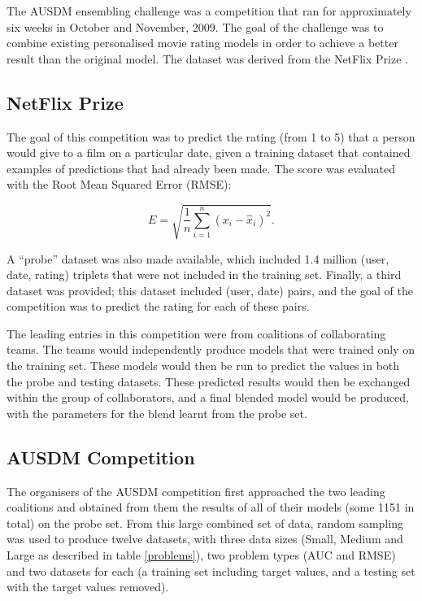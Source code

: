 \documentclass{article}
\begin{document}
The AUSDM ensembling challenge was a competition that ran for approximately six weeks in October and November, 2009.  The goal of the challenge was to combine existing personalised movie rating models in order to achieve a better result than the original model.  The dataset was derived from the NetFlix Prize \cite{NetFlixPrize}.

\subsection{NetFlix Prize}

The goal of this competition was to predict the rating (from 1 to 5) that a person would give to a film on a particular date, given a training dataset that contained examples of predictions that had already been made.  The score was evaluated with the Root Mean Squared Error (RMSE):

\begin{equation}
E = \sqrt{\frac{1}{n} \sum_{i=1}^{n} (x_i - \hat{x}_i)^2} \label{RMSE}.
\end{equation}

A ``probe'' dataset was also made available, which included 1.4 million (user, date, rating) triplets that were not included in the training set.  Finally, a third dataset was provided; this dataset included (user, date) pairs, and the goal of the competition was to predict the rating for each of these pairs.

The leading entries in this competition were from coalitions of collaborating teams.  The teams would independently produce models that were trained only on the training set.  These models would then be run to predict the values in both the probe and testing datasets.  These predicted results would then be exchanged within the group of collaborators, and a final blended model would be produced, with the parameters for the blend learnt from the probe set.

\subsection{AUSDM Competition}

The organisers of the AUSDM competition first approached the two leading coalitions and obtained from them the results of all of their models (some 1151 in total) on the probe set.  From this large combined set of data, random sampling was used to produce twelve datasets, with three data sizes (Small, Medium and Large as described in table \ref{problems}), two problem types (AUC and RMSE) and two datasets for each (a training set including target values, and a testing set with the target values removed).
\end{document}
